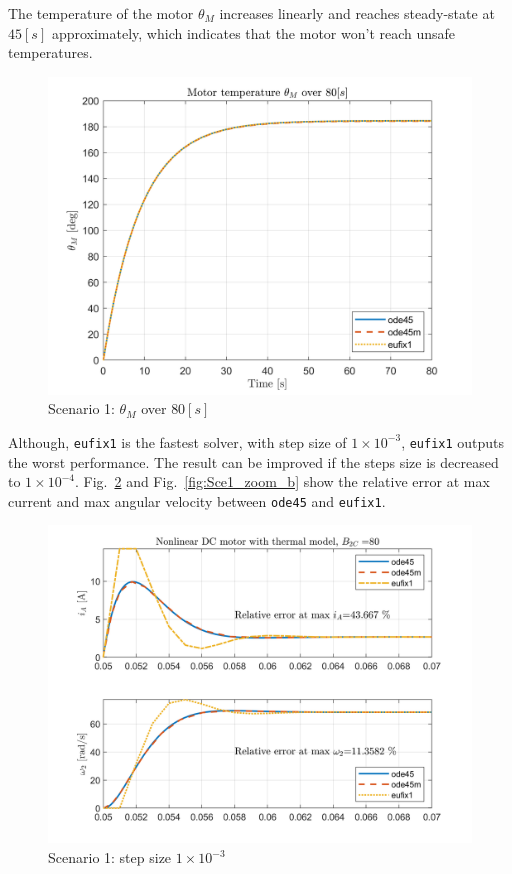 \documentclass[]{article}
\newcommand{\figref}[1]{Fig.~\ref{#1}}
\begin{document}
The temperature of the motor $\theta_M$ increases linearly and reaches steady-state at $45[s]$ approximately, which indicates that the motor won't reach unsafe temperatures.
\begin{figure}[H]
	\centering
	\includegraphics[width=0.65\linewidth]{thetaM_ode45-ode45m-eufix1_1e-3}
	\caption{Scenario 1: $\theta_M$ over $80[s]$}
	\label{fig:Sce1_thetaM}
\end{figure}

Although, \texttt{eufix1} is the fastest solver, with step size of $1\times 10^{-3}$, \texttt{eufix1} outputs the worst performance. The result can be improved if the steps size is decreased to $1\times 10^{-4}$. \figref{fig:Sce1_zoom_a} and \figref{fig:Sce1_zoom_b} show the relative error at max current and max angular velocity between \texttt{ode45} and \texttt{eufix1}.

\begin{figure}[H]
	\centering
	\includegraphics[width=0.80\linewidth]{E0_ode45-ode45m-eufix1_1e-3_zoom}
	\caption{Scenario 1: step size $1\times 10^{-3}$}
	\label{fig:Sce1_zoom_a}
\end{figure}
\end{document}
